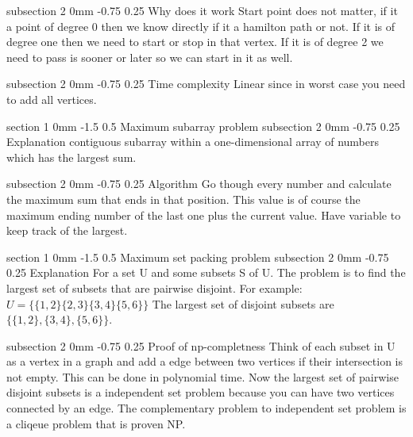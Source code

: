 \documentclass[a4paper,11pt]{article}
\makeatletter
\renewcommand{\section}{\@startsection
   {section}%
   {1}%
   {0mm}%
   {-1.5\baselineskip}%
   {0.5\baselineskip}%
   {\sffamily\bfseries\upshape\normalsize}}%
\renewcommand{\subsection}{\@startsection
   {subsection}%
   {2}%
   {0mm}%
   {-0.75\baselineskip}%
   {0.25\baselineskip}%
   {\rmfamily\normalfont\slshape\normalsize}}%
\makeatother
\begin{document}
\subsection{Why does it work}
Start point does not matter, if it a point of degree 0 then we know directly if it a hamilton path or not. If it is of degree one then we need to start or stop in that vertex. If it is of degree 2 we need to pass is sooner or later so we can start in it as well. 

\subsection{Time complexity}
Linear since in worst case you need to add all vertices.

\section{Maximum subarray problem}
\subsection{Explanation}
contiguous subarray within a one-dimensional array of numbers which has the largest sum.

\subsection{Algorithm}
Go though every number and calculate the maximum sum that ends in that position. This value is of course the maximum ending number of the last one plus the current value. Have variable to keep track of the largest.


\section{Maximum set packing problem}
\subsection{Explanation}
For a set U and some subsets S of U. The problem is to find the largest set of subsets that are pairwise disjoint. For example:
$U=\{\{1,2\}\{2,3\}\{3,4\}\{5,6\}\}$ The largest set of disjoint subsets are $\{\{1,2\},\{3,4\},\{5,6\}\}$.

\subsection{Proof of np-completness}
Think of each subset in U as a vertex in a graph and add a edge between two vertices if their intersection is not empty. This can be done in polynomial time. 
\newline
\newline
Now the largest set of pairwise disjoint subsets is a independent set problem because you can have two vertices connected by an edge. The complementary problem to independent set problem is a cliqeue problem that is proven NP.
\end{document}
